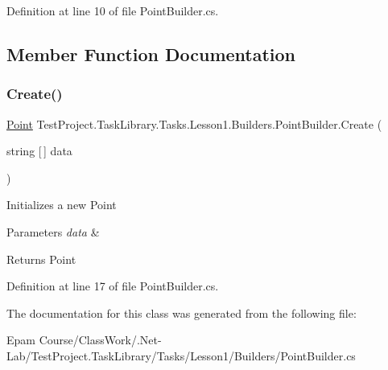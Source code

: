Definition at line 10 of file Point\+Builder.\+cs.



\subsection{Member Function Documentation}
\mbox{\label{class_test_project_1_1_task_library_1_1_tasks_1_1_lesson1_1_1_builders_1_1_point_builder_a40d3db3ed5e3d9619181995f9614a6ee}} 
\subsubsection{\texorpdfstring{Create()}{Create()}}
{\footnotesize\ttfamily \mbox{\hyperlink{class_test_project_1_1_task_library_1_1_tasks_1_1_lesson1_1_1_models_1_1_point}{Point}} Test\+Project.\+Task\+Library.\+Tasks.\+Lesson1.\+Builders.\+Point\+Builder.\+Create (\begin{DoxyParamCaption}\item[{string \mbox{[}$\,$\mbox{]}}]{data }\end{DoxyParamCaption})}



Initializes a new Point 


\begin{DoxyParams}{Parameters}
{\em data} & \\
\hline
\end{DoxyParams}
\begin{DoxyReturn}{Returns}
Point
\end{DoxyReturn}


Definition at line 17 of file Point\+Builder.\+cs.



The documentation for this class was generated from the following file\+:\begin{DoxyCompactItemize}
\item 
Epam Course/\+Class\+Work/.\+Net-\/\+Lab/\+Test\+Project.\+Task\+Library/\+Tasks/\+Lesson1/\+Builders/Point\+Builder.\+cs\end{DoxyCompactItemize}
